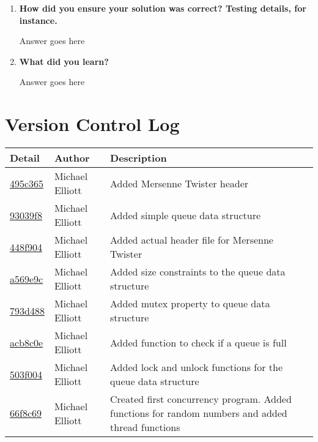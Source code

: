 \documentclass[letterpaper,10pt,titlepage,draftclsnofoot,onecolumn]{IEEEtran}
\begin{document}
\begin{enumerate}
\item \textbf{How did you ensure your solution was correct? Testing details, for instance.}

Answer goes here \par

\item \textbf{What did you learn?}

Answer goes here \par

\end{enumerate}

\section{Version Control Log}
\begin{tabular}{l l l}\textbf{Detail} & \textbf{Author} & \textbf{Description}\\\hline
\href{https://github.com/elliomic/CS-444/commit/495c3654bd7736ea43c6a88eb59743eab5e64695}{495c365} & Michael Elliott & Added Mersenne Twister header\\\hline
\href{https://github.com/elliomic/CS-444/commit/93039f88419ac754dcbd9f5e86c4acc2ae075c92}{93039f8} & Michael Elliott & Added simple queue data structure\\\hline
\href{https://github.com/elliomic/CS-444/commit/448f904d4299eed4f7290557a7dd2ed03a731583}{448f904} & Michael Elliott & Added actual header file for Mersenne Twister\\\hline
\href{https://github.com/elliomic/CS-444/commit/a569e9c76e5f3b7d77a61959641102f75df9826e}{a569e9c} & Michael Elliott & Added size constraints to the queue data structure\\\hline
\href{https://github.com/elliomic/CS-444/commit/793d488cb52123a48e8d345293ce4359e2c301c1}{793d488} & Michael Elliott & Added mutex property to queue data structure\\\hline
\href{https://github.com/elliomic/CS-444/commit/acb8c0e69e610e33efc6d0764caa3ccc66a663d9}{acb8c0e} & Michael Elliott & Added function to check if a queue is full\\\hline
\href{https://github.com/elliomic/CS-444/commit/503f004502547d608cf63b7cd5b60aad8b3ab3f7}{503f004} & Michael Elliott & Added lock and unlock functions for the queue data structure\\\hline
\href{https://github.com/elliomic/CS-444/commit/66f8c69f4b2b4122718aad4f72a9eeadd9e06545}{66f8c69} & Michael Elliott & Created first concurrency program. Added functions for random numbers and added thread functions\\\hline

\end{tabular}
\end{document}
